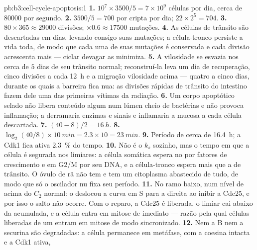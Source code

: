 \begin{solution}{pb:b3:cell-cycle-apoptosis:1}
\textbf{1.} $10^{7}\times 3500/5 = 7\times 10^{9}$ células por dia,
cerca de \num{80000} por segundo.
\textbf{2.} $3500/5 = 700$ por cripta por dia; $22\times 2^{5} = 704$.
\textbf{3.} $80\times 365 \approx \num{29000}$ divisões; $\times 0.6
\approx \num{17500}$ mutações.
\textbf{4.} As células de trânsito são descartadas em dias, levando
consigo suas mutações; a célula-tronco persiste a vida toda, de modo
que cada uma de suas mutações é conservada e cada divisão acrescenta
mais --- ciclar devagar as minimiza.
\textbf{5.} A vilosidade se esvazia nos cerca de $5$ dias de seu
trânsito normal; reconstruí-la leva um dia de recuperação, cinco
divisões a cada \qty{12}{h} e a migração vilosidade acima --- quatro a
cinco dias, durante os quais a barreira fica nua: as divisões rápidas
de trânsito do intestino fazem dele uma das primeiras vítimas da
radiação.
\textbf{6.} Um corpo apoptótico selado não libera conteúdo algum num
lúmen cheio de bactérias e não provoca inflamação; a  derramaria
enzimas e sinais e inflamaria a mucosa a cada célula descartada.
\textbf{7.} $(40 - 8)/2 = \qty{16}{h}$.
\textbf{8.} $\log_{2}(40/8)\times \qty{10}{min} = 2.3\times 10 =
\qty{23}{min}$.
\textbf{9.} Período de cerca de \qty{16.4}{h}; a Cdk1 fica ativa
\qty{2.3}{\%} do tempo.
\textbf{10.} Não é o $k_{s}$ sozinho, mas o tempo em que a célula é
segurada nos limiares: a célula somática espera no 
por fatores de crescimento e em G2/M por seu DNA, e a célula-tronco
espera mais que a de trânsito. O óvulo de rã não tem 
e tem um citoplasma abastecido de tudo, de modo que só o oscilador nu
fixa seu período.
\textbf{11.} No ramo baixo, num nível de  acima do $C_{2}$
normal: o  deslocou a curva em S para a direita ao
inibir a Cdc25, e por isso o salto não ocorre. Com o reparo, a Cdc25 é
liberada, o limiar cai abaixo da  acumulada, e a célula entra em
mitose de imediato --- razão pela qual células liberadas de um  entram em mitose de modo sincronizado.
\textbf{12.} Nem a  B nem a securina são degradadas: a célula
permanece em metáfase, com a coesina intacta e a Cdk1 ativa,

\end{solution}
